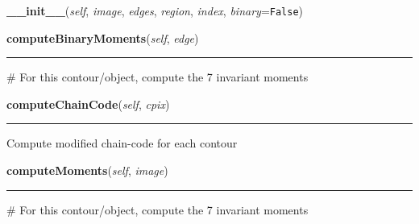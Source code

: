     \begin{boxedminipage}{\textwidth}

    \raggedright \textbf{\_\_init\_\_}(\textit{self}, \textit{image}, \textit{edges}, \textit{region}, \textit{index}, \textit{binary}=\texttt{F\-a\-l\-s\-e\-})

    \end{boxedminipage}

    \label{multireg:objectlist:Object:computeBinaryMoments}
    \vspace{0.5ex}

    \begin{boxedminipage}{\textwidth}

    \raggedright \textbf{computeBinaryMoments}(\textit{self}, \textit{edge})

    \vspace{-1.5ex}

    \rule{\textwidth}{0.5\fboxrule}
    \# For this contour/object, compute the 7 invariant moments

    \vspace{1ex}

    \end{boxedminipage}

    \label{multireg:objectlist:Object:computeChainCode}
    \vspace{0.5ex}

    \begin{boxedminipage}{\textwidth}

    \raggedright \textbf{computeChainCode}(\textit{self}, \textit{cpix})

    \vspace{-1.5ex}

    \rule{\textwidth}{0.5\fboxrule}
    Compute modified chain-code for each contour

    \vspace{1ex}

    \end{boxedminipage}

    \label{multireg:objectlist:Object:computeMoments}
    \vspace{0.5ex}

    \begin{boxedminipage}{\textwidth}

    \raggedright \textbf{computeMoments}(\textit{self}, \textit{image})

    \vspace{-1.5ex}

    \rule{\textwidth}{0.5\fboxrule}
    \# For this contour/object, compute the 7 invariant moments

    \vspace{1ex}

    \end{boxedminipage}

